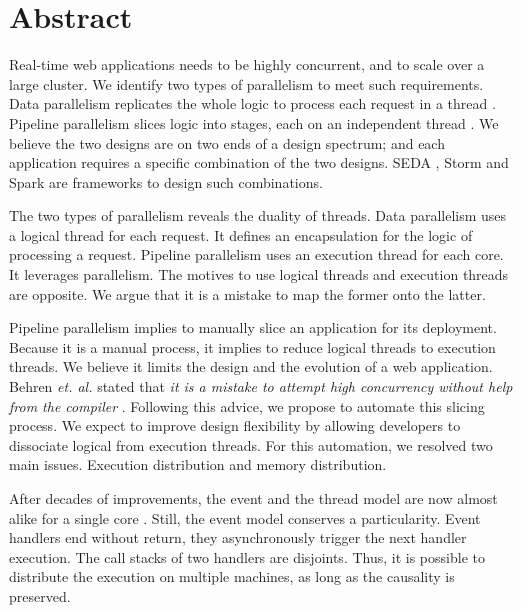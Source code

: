 \section*{Abstract}

Real-time web applications needs to be highly concurrent, and to scale over a large cluster.
We identify two types of parallelism to meet such requirements.
Data parallelism replicates the whole logic to process each request in a thread \cite{Behren2003}.
Pipeline parallelism slices logic into stages, each on an independent thread \cite{Ousterhout1996}.
We believe the two designs are on two ends of a design spectrum; and each application requires a specific combination of the two designs.
SEDA \cite{Welsh2000}, Storm and Spark are frameworks to design such combinations.

The two types of parallelism reveals the duality of threads.
Data parallelism uses a logical thread for each request.
It defines an encapsulation for the logic of processing a request.
Pipeline parallelism uses an execution thread for each core.
It leverages parallelism.
The motives to use logical threads and execution threads are opposite.
We argue that it is a mistake to map the former onto the latter.

Pipeline parallelism implies to manually slice an application for its deployment.
Because it is a manual process, it implies to reduce logical threads to execution threads.
We believe it limits the design and the evolution of a web application.
Behren \textit{et. al.} stated that \textit{it is a mistake to attempt high concurrency without help from the compiler} \cite{Behren2003}.
Following this advice, we propose to automate this slicing process.
We expect to improve design flexibility by allowing developers to dissociate logical from execution threads.
For this automation, we resolved two main issues.
Execution distribution and memory distribution.

After decades of improvements, the event and the thread model are now almost alike for a single core \cite{Adya2002}.
Still, the event model conserves a particularity.
Event handlers end without return, they asynchronously trigger the next handler execution.
The call stacks of two handlers are disjoints.
Thus, it is possible to distribute the execution on multiple machines, as long as the causality is preserved.

